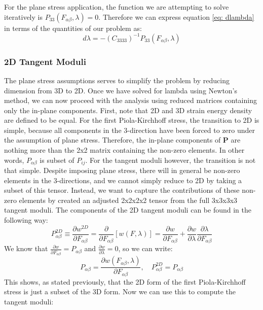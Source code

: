 \documentclass[]{spie}  %
\begin{document}
For the plane stress application, the function we are attempting to solve iteratively is $P_{33}(F_{\alpha\beta}, \lambda) = 0$. Therefore we can express equation \ref{eq: dlambda} in terms of the quantities of our problem as:
\begin{equation}
\label{eq: dlambda P}
d\lambda = - (C_{3333})^{-1} P_{33}(F_{\alpha\beta}, \lambda)
\end{equation}

\subsubsection{2D Tangent Moduli}
The plane stress assumptions serves to simplify the problem by reducing dimension from 3D to 2D. Once we have solved for lambda using Newton's method, we can now proceed with the analysis using reduced matrices containing only the in-plane components. First, note that 2D and 3D strain energy density are defined to be equal. For the first Piola-Kirchhoff stress, the transition to 2D is simple, because all components in the 3-direction have been forced to zero under the assumption of plane stress. Therefore, the in-plane components of $\bm{P}$ are nothing more than the 2x2 matrix containing the non-zero elements. In other words, $P_{\alpha\beta}$ is subset of $P_{ij}$. For the tangent moduli however, the transition is not that simple. Despite imposing plane stress, there will in general be non-zero elements in the 3-directions, and we cannot simply reduce to 2D by taking a subset of this tensor. Instead, we want to capture the contributions of these non-zero elements by created an adjusted 2x2x2x2 tensor from the full 3x3x3x3 tangent moduli. The components of the 2D tangent moduli can be found in the following way:
\begin{equation}
P^{2D}_{\alpha\beta} \equiv \frac{\partial w^{2D}}{\partial F_{\alpha\beta}} = \frac{\partial}{\partial F_{\alpha\beta}}
						\left[ w(F, \lambda) \right] = \frac{\partial w}{\partial F_{\alpha\beta}} + \frac{\partial w}{\partial \lambda} \frac{\partial \lambda}{\partial F_{\alpha\beta}}
\end{equation}
We know that $\frac{\partial w}{\partial F_{\alpha\beta}} = P_{\alpha\beta}$ and $\frac{\partial w}{\partial \lambda} = 0$, so we can write:
\begin{equation}
P_{\alpha\beta} = \frac{\partial w(F_{\alpha\beta}, \lambda)}{\partial F_{\alpha\beta}}, \quad P^{2D}_{\alpha\beta} = P_{\alpha\beta}
\end{equation}
This shows, as stated previously, that the 2D form of the first Piola-Kirchhoff stress is just a subset of the 3D form. Now we can use this to compute the tangent moduli:
\end{document}
